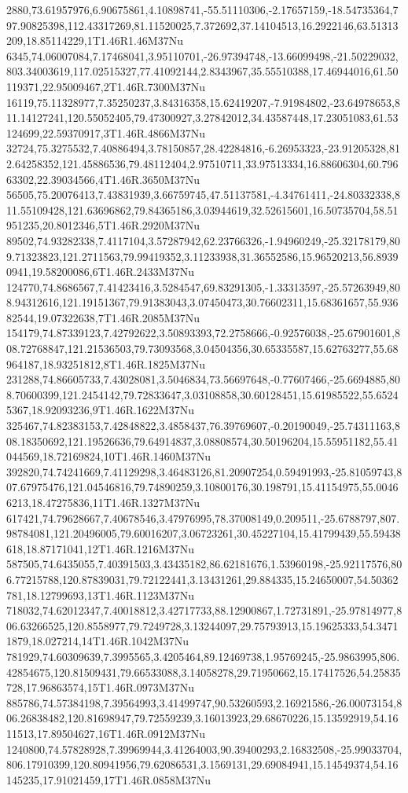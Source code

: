 2880,73.61957976,6.90675861,4.10898741,-55.51110306,-2.17657159,-18.54735364,797.90825398,112.43317269,81.11520025,7.372692,37.14104513,16.2922146,63.51313209,18.85114229,1T1.46R1.46M37Nu
6345,74.06007084,7.17468041,3.95110701,-26.97394748,-13.66099498,-21.50229032,803.34003619,117.02515327,77.41092144,2.8343967,35.55510388,17.46944016,61.50119371,22.95009467,2T1.46R.7300M37Nu
16119,75.11328977,7.35250237,3.84316358,15.62419207,-7.91984802,-23.64978653,811.14127241,120.55052405,79.47300927,3.27842012,34.43587448,17.23051083,61.53124699,22.59370917,3T1.46R.4866M37Nu
32724,75.3275532,7.40886494,3.78150857,28.42284816,-6.26953323,-23.91205328,812.64258352,121.45886536,79.48112404,2.97510711,33.97513334,16.88606304,60.79663302,22.39034566,4T1.46R.3650M37Nu
56505,75.20076413,7.43831939,3.66759745,47.51137581,-4.34761411,-24.80332338,811.55109428,121.63696862,79.84365186,3.03944619,32.52615601,16.50735704,58.51951235,20.8012346,5T1.46R.2920M37Nu
89502,74.93282338,7.4117104,3.57287942,62.23766326,-1.94960249,-25.32178179,809.71323823,121.2711563,79.99419352,3.11233938,31.36552586,15.96520213,56.89390941,19.58200086,6T1.46R.2433M37Nu
124770,74.8686567,7.41423416,3.5284547,69.83291305,-1.33313597,-25.57263949,808.94312616,121.19151367,79.91383043,3.07450473,30.76602311,15.68361657,55.93682544,19.07322638,7T1.46R.2085M37Nu
154179,74.87339123,7.42792622,3.50893393,72.2758666,-0.92576038,-25.67901601,808.72768847,121.21536503,79.73093568,3.04504356,30.65335587,15.62763277,55.68964187,18.93251812,8T1.46R.1825M37Nu
231288,74.86605733,7.43028081,3.5046834,73.56697648,-0.77607466,-25.6694885,808.70600399,121.2454142,79.72833647,3.03108858,30.60128451,15.61985522,55.65245367,18.92093236,9T1.46R.1622M37Nu
325467,74.82383153,7.42848822,3.4858437,76.39769607,-0.20190049,-25.74311163,808.18350692,121.19526636,79.64914837,3.08808574,30.50196204,15.55951182,55.41044569,18.72169824,10T1.46R.1460M37Nu
392820,74.74241669,7.41129298,3.46483126,81.20907254,0.59491993,-25.81059743,807.67975476,121.04546816,79.74890259,3.10800176,30.198791,15.41154975,55.00466213,18.47275836,11T1.46R.1327M37Nu
617421,74.79628667,7.40678546,3.47976995,78.37008149,0.209511,-25.6788797,807.98784081,121.20496005,79.60016207,3.06723261,30.45227104,15.41799439,55.59438618,18.87171041,12T1.46R.1216M37Nu
587505,74.6435055,7.40391503,3.43435182,86.62181676,1.53960198,-25.92117576,806.77215788,120.87839031,79.72122441,3.13431261,29.884335,15.24650007,54.50362781,18.12799693,13T1.46R.1123M37Nu
718032,74.62012347,7.40018812,3.42717733,88.12900867,1.72731891,-25.97814977,806.63266525,120.8558977,79.7249728,3.13244097,29.75793913,15.19625333,54.34711879,18.027214,14T1.46R.1042M37Nu
781929,74.60309639,7.3995565,3.4205464,89.12469738,1.95769245,-25.9863995,806.42854675,120.81509431,79.66533088,3.14058278,29.71950662,15.17417526,54.25835728,17.96863574,15T1.46R.0973M37Nu
885786,74.57384198,7.39564993,3.41499747,90.53260593,2.16921586,-26.00073154,806.26838482,120.81698947,79.72559239,3.16013923,29.68670226,15.13592919,54.1611513,17.89504627,16T1.46R.0912M37Nu
1240800,74.57828928,7.39969944,3.41264003,90.39400293,2.16832508,-25.99033704,806.17910399,120.80941956,79.62086531,3.1569131,29.69084941,15.14549374,54.16145235,17.91021459,17T1.46R.0858M37Nu
